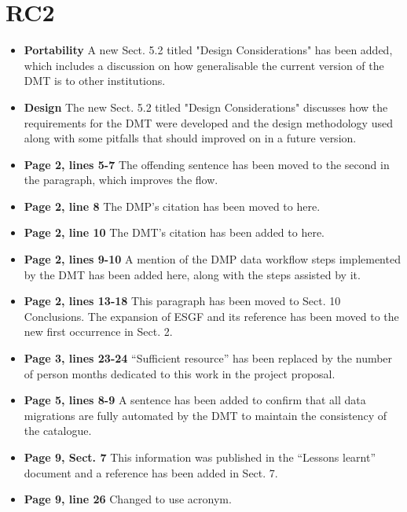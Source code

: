 \documentclass[12pt,a4paper]{article}
\begin{document}
\section{RC2}
\begin{itemize}
\item \textbf{Portability} A new Sect. 5.2 titled "Design Considerations" has been added, which includes a discussion on how generalisable the current version of the DMT is to other institutions.
	 
\item \textbf{Design} The new Sect. 5.2 titled "Design Considerations" discusses how the requirements for the DMT were developed and the design methodology used along with some pitfalls that should improved on in a future version.

\item \textbf{Page 2, lines 5-7} The offending sentence has been moved to the second in the paragraph, which improves the flow.

\item \textbf{Page 2, line 8} The DMP's citation has been moved to here.

\item \textbf{Page 2, line 10} The DMT's citation has been added to here.

\item \textbf{Page 2, lines 9-10} A mention of the DMP data workflow steps implemented by the DMT has been added here, along with the steps assisted by it.

\item \textbf{Page 2, lines 13-18} This paragraph has been moved to Sect. 10 Conclusions. The expansion of ESGF and its reference has been moved to the new first occurrence in Sect. 2.

\item \textbf{Page 3, lines 23-24} ``Sufficient resource'' has been replaced by the number of person months dedicated to this work in the project proposal.

\item \textbf{Page 5, lines 8-9} A sentence has been added to confirm that all data migrations are fully automated by the DMT to maintain the consistency of the catalogue.

\item \textbf{Page 9, Sect. 7} This information was published in the ``Lessons learnt'' document and a reference has been added in Sect. 7.

\item \textbf{Page 9, line 26} Changed to use acronym.


\end{itemize}
\end{document}
